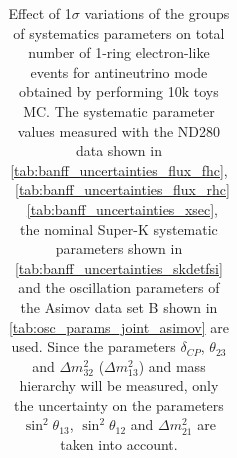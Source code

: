 \begin{table}[htb]
\begin{tabular}{| c | c | c |}
\end{tabular}
\caption{
 Effect of 1$\sigma$ variations of the groups of systematics parameters on total number of
 1-ring electron-like events for antineutrino mode obtained by performing 10k toys MC.
The systematic parameter values measured with the ND280 data 
shown in 
\cref{tab:banff_uncertainties_flux_fhc},
~\ref{tab:banff_uncertainties_flux_rhc}
~\ref{tab:banff_uncertainties_xsec},
the nominal Super-K systematic parameters shown in \cref{tab:banff_uncertainties_skdetfsi}
and the oscillation parameters of the Asimov data set B shown in \cref{tab:osc_params_joint_asimov}
are used.
Since the parameters $\delta_{CP}$, $\theta_{23}$ and $\Delta m^2_{32}$ ($\Delta m^2_{13}$) and mass hierarchy
will be measured,
only the uncertainty on the parameters 
$\sin^2 \theta_{13}$,
$\sin^2 \theta_{12}$
and 
$\Delta m^2_{21}$ 
are taken into account.
}                                                                                                                                                                                          
\label{tab:nsk_systematic_table_summary_joint_asimov_B_rhc_elike_Run17c}
\end{table}


















